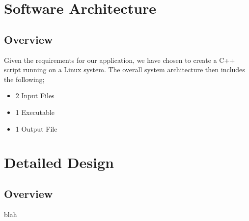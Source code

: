 \documentclass{article}
\begin{document}
\section{Software Architecture}
\subsection{Overview}
Given the requirements for our application, we have chosen to create a C++ script running on a Linux system.
The overall system architecture then includes the following; 
\begin{itemize}
\item 2 Input Files
\item 1 Executable
\item 1 Output File
\end{itemize}

\section{Detailed Design}
\subsection{Overview}
blah
\end{document}
